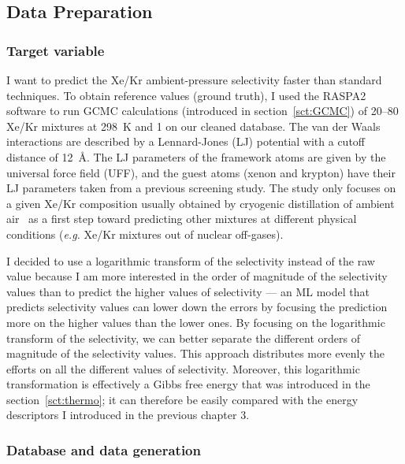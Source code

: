 \documentclass[main]{subfiles}
\begin{document}
\subsection{Data Preparation}


\subsubsection{Target variable}

I want to predict the Xe/Kr ambient-pressure selectivity faster than standard techniques. To obtain reference values (ground truth), I used the RASPA2 software\autocite{dubbeldam2016} to run GCMC calculations (introduced in section~\ref{sct:GCMC}) of 20–80 Xe/Kr mixtures at \SI{298}{\kelvin} and \SI{1}{\atm} on our cleaned database. The van der Waals interactions are described by a Lennard-Jones (LJ) potential with a cutoff distance of \SI{12}{\angstrom}. The LJ parameters of the framework atoms are given by the universal force field (UFF),\autocite{rappe1992} and the guest atoms (xenon and krypton) have their LJ parameters taken from a previous screening study.\autocite{Ryan_2010} The study only focuses on a given Xe/Kr composition usually obtained by cryogenic distillation of ambient air~\autocite{kerry2007industrial} as a first step toward predicting other mixtures at different physical conditions (\emph{e.g.} Xe/Kr mixtures out of nuclear off-gases). 

I decided to use a logarithmic transform of the selectivity instead of the raw value because I am more interested in the order of magnitude of the selectivity values than to predict the higher values of selectivity --- an ML model that predicts selectivity values can lower down the errors by focusing the prediction more on the higher values than the lower ones. By focusing on the logarithmic transform of the selectivity, we can better separate the different orders of magnitude of the selectivity values. This approach distributes more evenly the efforts on all the different values of selectivity. Moreover, this logarithmic transformation is effectively a Gibbs free energy that was introduced in the section~\ref{sct:thermo}; it can therefore be easily compared with the energy descriptors I introduced in the previous chapter 3.

\subsubsection{Database and data generation}
\end{document}
